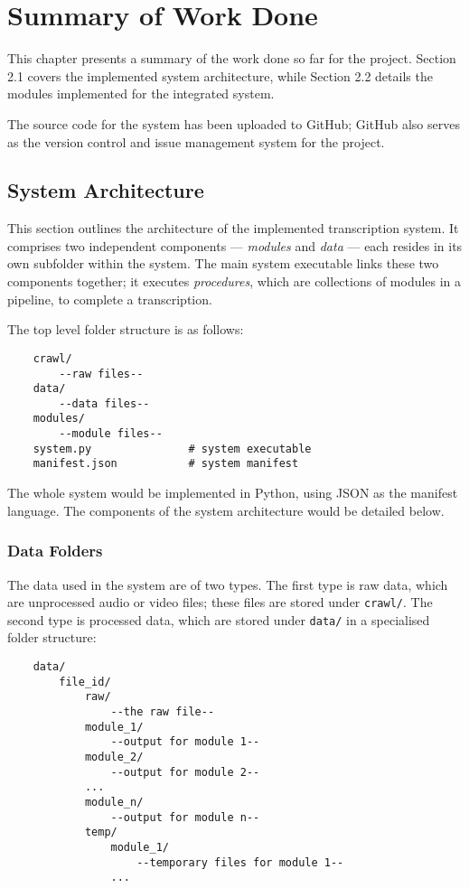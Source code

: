 \chapter{Summary of Work Done}

This chapter presents a summary of the work done so far for the project. Section 2.1 covers the implemented system architecture, while Section 2.2 details the modules implemented for the integrated system.

The source code for the system has been uploaded to GitHub; GitHub also serves as the version control and issue management system for the project.

\section{System Architecture}

This section outlines the architecture of the implemented transcription system. It comprises two independent components --- \textit{modules} and \textit{data} --- each resides in its own subfolder within the system. The main system executable links these two components together; it executes \textit{procedures}, which are collections of modules in a pipeline, to complete a transcription.

The top level folder structure is as follows:

\begin{lstlisting}
    crawl/
        --raw files--
    data/
        --data files--
    modules/
        --module files--
    system.py               # system executable
    manifest.json           # system manifest
\end{lstlisting}

The whole system would be implemented in Python, using JSON as the manifest language. The components of the system architecture would be detailed below.

\subsection{Data Folders}

The data used in the system are of two types. The first type is raw data, which are unprocessed audio or video files; these files are stored under \verb|crawl/|. The second type is processed data, which are stored under \verb|data/| in a specialised folder structure:

\begin{lstlisting}
    data/
        file_id/
            raw/
                --the raw file--
            module_1/
                --output for module 1--
            module_2/
                --output for module 2--
            ...
            module_n/
                --output for module n--
            temp/
                module_1/
                    --temporary files for module 1--
                ...
\end{lstlisting}

